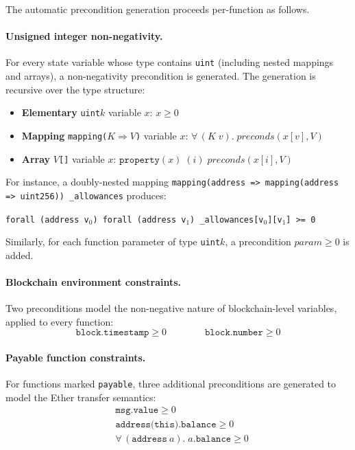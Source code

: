 The automatic precondition generation proceeds per-function as follows.

\paragraph{Unsigned integer non-negativity.}
For every state variable whose type contains \texttt{uint} (including nested mappings and arrays), a non-negativity precondition is generated. The generation is recursive over the type structure:

\begin{itemize}
    \item \textbf{Elementary} \texttt{uint$k$} variable $x$: \quad $x \geq 0$
    \item \textbf{Mapping} \texttt{mapping($K \Rightarrow V$)} variable $x$: \quad $\forall\, (K\; v).\; \mathit{preconds}(x[v], V)$
    \item \textbf{Array} \texttt{$V$[]} variable $x$: \quad $\texttt{property}(x)\;(i)\; \mathit{preconds}(x[i], V)$
\end{itemize}

\noindent For instance, a doubly-nested mapping \texttt{mapping(address => mapping(address => uint256)) \_allowances} produces:
\begin{center}
\texttt{forall (address v$_0$) forall (address v$_1$) \_allowances[v$_0$][v$_1$] >= 0}
\end{center}

Similarly, for each function parameter of type \texttt{uint$k$}, a precondition $\textit{param} \geq 0$ is added.

\paragraph{Blockchain environment constraints.}
Two preconditions model the non-negative nature of blockchain-level variables, applied to every function:
\[
\texttt{block.timestamp} \geq 0 \qquad\qquad \texttt{block.number} \geq 0
\]

\paragraph{Payable function constraints.}
For functions marked \texttt{payable}, three additional preconditions are generated to model the Ether transfer semantics:
\begin{align*}
&\texttt{msg.value} \geq 0 \\
&\texttt{address(this).balance} \geq 0 \\
&\forall\, (\texttt{address}\ a).\; a\texttt{.balance} \geq 0
\end{align*}

